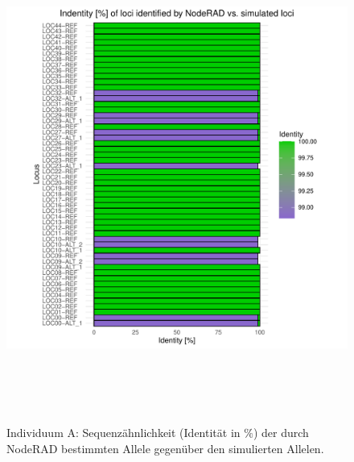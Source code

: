 \begin{figure}[H]
	\begin{center}
		\includegraphics[height=16cm]{bilder/evaluation/perc_ident/A.plot_loci.pdf}
		\caption{Individuum A: Sequenzähnlichkeit (Identität in $ \% $) der durch NodeRAD bestimmten Allele gegenüber den simulierten Allelen.}
		\label{fig:a-ident}
	\end{center}
\end{figure}

